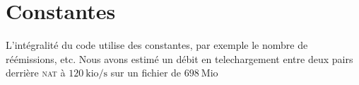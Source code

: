 \section{Constantes}
L'intégralité du code utilise des constantes, par exemple le nombre de réémissions, etc.
Nous avons estimé un débit en telechargement entre deux pairs derrière \textsc{nat} à $120~\text{kio/s}$ sur un fichier de $698~\text{Mio}$
